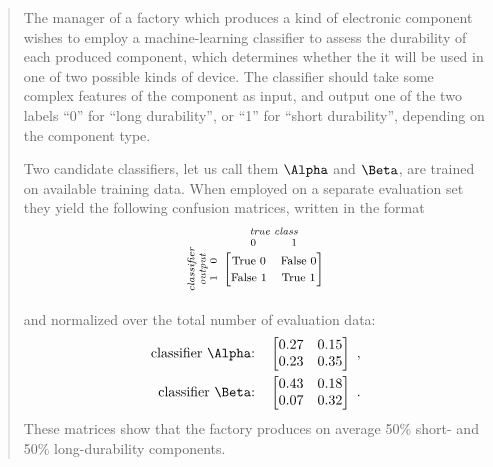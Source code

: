 \documentclass[\ifafour a4paper,12pt,\else a5paper,10pt,\fi%
onecolumn,oneside,article,%
british%
]{memoir}
\theoremstyle{remark}
\theoremstyle{innote}
\renewcommand*{\|}[1][]{\nonscript\:#1\vert\nonscript\:\mathopen{}}
\begin{document}
\begin{quotation}
  \small The manager of a factory which produces a kind of electronic component wishes to employ a machine-learning classifier to assess the durability of each produced component, which determines whether the it will be used in one of two possible kinds of device. The classifier should take some complex features of the component as input, and output one of the two labels \enquote{0} for \enquote{long durability}, or \enquote{1} for \enquote{short durability}, depending on the component type.

Two candidate classifiers, let us call them $\Alpha$ and $\Beta$, are trained on available training data. When employed on a separate evaluation set they yield the following confusion matrices, written in the format
\begin{equation*}
  \rotatebox[origin=c]{90}{
    \textit{\parbox{\widthof{classifier}}{\centering\scriptsize classifier\\output\\$1\quad 0$}}
    }\ 
    \overbracket[0pt]{
      \begin{bmatrix}
    \text{\footnotesize True 0} & \text{\footnotesize False 0}\\
    \text{\footnotesize False 1} & \text{\footnotesize True 1}\\
      \end{bmatrix}}^{
      \textit{\parbox{\widthof{\scriptsize true class}}{\centering\scriptsize true class\\$0\hspace{3em}1$}}
    }
\end{equation*}
and normalized over the total number of evaluation data:
\begin{align}
  \label{eq:CM_A}
\text{classifier $\Alpha$:}\quad  \begin{bmatrix}
    0.27 & 0.15 \\ 0.23 & 0.35
  \end{bmatrix}
\ ,
  \\
  \label{eq:CM_B}
\text{classifier $\Beta$:}\quad  \begin{bmatrix}
    0.43 & 0.18 \\ 0.07 & 0.32
  \end{bmatrix}
\ .
\end{align}
These matrices show that the factory produces on average 50\% short- and 50\% long-durability components.


\end{quotation}
\end{document}
